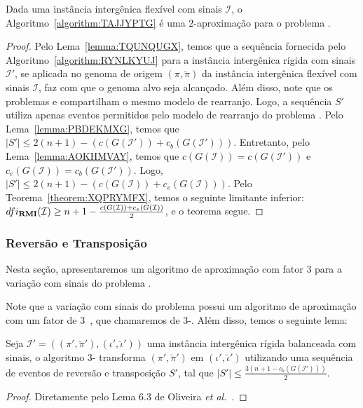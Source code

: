 

\begin{theorem}\label{theorem:PQWPQJDG}
Dada uma instância intergênica flexível com sinais $\mathcal{I}$, o Algoritmo~\ref{algorithm:TAJJYPTG} é uma $2$-aproximação para o problema \SbFIRMI{}.
\end{theorem}
\begin{proof}
Pelo Lema~\ref{lemma:TQUNQUGX}, temos que a sequência fornecida pelo Algoritmo~\ref{algorithm:RYNLKYUJ} para a instância intergênica rígida com sinais $\mathcal{I'}$, se aplicada no genoma de origem $(\pi,\breve\pi)$ da instância intergênica flexível com sinais $\mathcal{I}$, faz com que o genoma alvo seja alcançado. Além disso, note que os problemas \SbIRMI{} e \SbFIRMI{} compartilham o mesmo modelo de rearranjo. Logo, a sequência $S'$ utiliza apenas eventos permitidos pelo modelo de rearranjo do problema \SbFIRMI{}. Pelo Lema~\ref{lemma:PBDEKMXG}, temos que $|S'| \le 2(n + 1) - (c(G(\mathcal{I}')) + c_b(G(\mathcal{I}')))$. Entretanto, pelo Lema~\ref{lemma:AOKHMVAY}, temos que $c(G(\mathcal{I})) = c(G(\mathcal{I}'))$ e $c_e(G(\mathcal{I})) = c_b(G(\mathcal{I}'))$. Logo, $|S'| \le 2(n + 1) - (c(G(\mathcal{I})) + c_e(G(\mathcal{I})))$. Pelo Teorema~\ref{theorem:XQPRYMFX}, temos o seguinte limitante inferior: $dfi_{\textbf{RMI}}(\mathcal{I}) \ge {n+1} - \frac{c(G(\mathcal{I})) + c_e(G(\mathcal{I}))}{2}$, e o teorema segue.
\end{proof}

\subsubsection{Reversão e Transposição}

Nesta seção, apresentaremos um algoritmo de aproximação com fator $3$ para a variação com sinais do problema \SbFIRT{}. 

Note que a variação com sinais do problema \SbIRT{} possui um algoritmo de aproximação com um fator de $3$~\cite{2021a-oliveira-etal}, que chamaremos de $3$-\SbIRT{}. Além disso, temos o seguinte lema:

\begin{lemma}\label{lemma:MNQTVIRT}
Seja $\mathcal{I}' = ((\pi',\breve\pi'),(\iota',\breve\iota'))$ uma instância intergênica rígida balanceada com sinais, o algoritmo $3$-\SbIRT{} transforma $(\pi',\breve\pi')$ em $(\iota',\breve\iota')$ utilizando uma sequência de eventos de reversão e transposição $S'$, tal que $|S'| \le \frac{3({n+1} - c_b(G(\mathcal{I}')))}{2}$.
\end{lemma}
\begin{proof}
Diretamente pelo Lema 6.3 de Oliveira \textit{et al.}~\cite{2021a-oliveira-etal}.
\end{proof}

